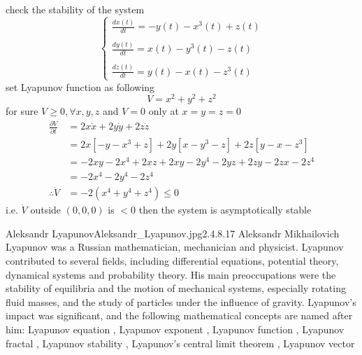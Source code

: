 \documentclass[]{article}
\begin{document}
\begin{example}
    check the stability of the system   
    \begin{equation*}
        \begin{cases}
             \displaystyle \frac{dx(t)}{dt} = -y(t) - x^3(t) + z(t)
             \\\\
             \displaystyle \frac{dy(t)}{dt} = x(t) - y^3(t) - z(t)
             \\\\
             \displaystyle \frac{dz(t)}{dt} = y(t) - x(t) - z^3(t)
         \end{cases}
     \end{equation*} 
     set Lyapunov function as following 
     \[
     V = x^2 + y^2 + z^2
     \]   
for sure $V \geq 0 , \forall x,y,z$ and $V = 0$ only at $x=y=z=0 $
\begin{align*}
    \frac{\partial V}{\partial t} &= 2x \dot{x} +2y\dot{y} +2z \dot{z}     
    \\
    &= 2x[-y - x^3 + z] +2y[x - y^3 - z] +2z[y - x - z^3]
    \\
    &=-2xy -2x^4 + 2xz +2xy -2y^4 -2yz +2zy -2zx -2z^4
    \\
    &= -2x^4 -2y^4 -2z^4
    \\
    \therefore \dot{V} &=  -2(x^4 + y^4 + z^4) \leq 0
\end{align*}
i.e. $\dot{V}$ outside $(0,0,0)$ is $<0$ then the system is asymptotically stable
\end{example}

\begin{enrichment}{Aleksandr Lyapunov}{Aleksandr_Lyapunov.jpg}{2.4}{.8}{.17}
    Aleksandr Mikhailovich Lyapunov was a Russian mathematician, mechanician and physicist. Lyapunov contributed to several fields, including differential equations, potential theory, dynamical systems and probability theory. His main preoccupations were the stability of equilibria and the motion of mechanical systems, especially rotating fluid masses, and the study of particles under the influence of gravity.
    Lyapunov's impact was significant, and the following mathematical concepts are named after him:
        Lyapunov equation ,
        Lyapunov exponent ,
        Lyapunov function ,
        Lyapunov fractal ,
        Lyapunov stability ,
        Lyapunov's central limit theorem ,
        Lyapunov vector
\end{enrichment}


\setcounter{equation}{0}
\newpage
\end{document}
